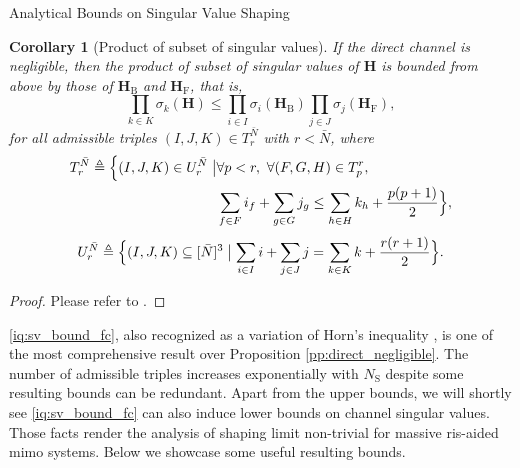 \documentclass[journal]{IEEEtran}
\newtheorem{corollary}{Corollary}[proposition]
\begin{document}
\begin{section}{Analytical Bounds on Singular Value Shaping}
		\begin{corollary}[Product of subset of singular values\label{co:sv_bound_horn}]
			If the direct channel is negligible,
			then the product of subset of singular values of $\mathbf{H}$ is bounded from above by those of $\mathbf{H}_\mathrm{B}$ and $\mathbf{H}_\mathrm{F}$, that is,
			\begin{equation}
				\prod_{k \in {K}} \sigma_k(\mathbf{H}) \le \prod_{i \in {I}} \sigma_i(\mathbf{H}_\mathrm{B}) \prod_{j \in {J}} \sigma_j(\mathbf{H}_\mathrm{F}),
				\label{iq:sv_bound_fc}
			\end{equation}
			for all admissible triples $(I, J, K) \in T_r^{\bar{N}}$ with $r < \bar{N}$, where
			\begin{equation*}
				\begin{split}
					T_r^{\bar{N}} \triangleq \Bigl\{(I, J, K) \in U_r^{\bar{N}} \bigm\vert & \forall p < r, \ \forall (F, G, H) \in T_p^r,\\
					& \sum_{f \in F} i_f + \sum_{g \in G} j_g \le \sum_{h \in H} k_h + \frac{p(p+1)}{2} \Bigr\},
				\end{split}
			\end{equation*}
			\begin{equation*}
				U_r^{\bar{N}} \triangleq \Bigl\{(I, J, K) \subseteq [\bar{N}]^3 \bigm\vert \sum_{i \in I} i + \sum_{j \in J} j = \sum_{k \in K} k + \frac{r(r+1)}{2}\Bigr\}.
			\end{equation*}
		\end{corollary}

		\begin{proof}
			Please refer to \cite[Theorem~8]{Fulton2000}.
		\end{proof}

		\eqref{iq:sv_bound_fc}, also recognized as a variation of Horn's inequality \cite{Bhatia2001}, is one of the most comprehensive result over Proposition \ref{pp:direct_negligible}.
		The number of admissible triples increases exponentially with $N_\mathrm{S}$ despite some resulting bounds can be redundant.
		Apart from the upper bounds, we will shortly see \eqref{iq:sv_bound_fc} can also induce lower bounds on channel singular values.
		Those facts render the analysis of shaping limit non-trivial for massive \gls{ris}-aided \gls{mimo} systems.
		Below we showcase some useful resulting bounds.


\end{section}
\end{document}
